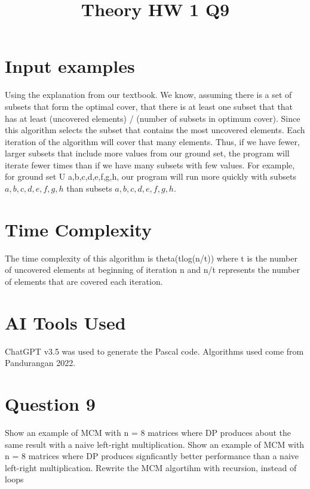 \documentclass[conference]{IEEEtran}
\begin{document}
\section{Input examples}
Using the explanation from our textbook. We know, assuming there is a set of subsets that form the optimal cover, that there is at least one subset that that has at least (uncovered elements) / (number of subsets in optimum cover). Since this algorithm selects the subset that contains the most uncovered elements. Each iteration of the algorithm will cover that many elements. Thus, if we have fewer, larger subsets that include more values from our ground set, the program will iterate fewer times than if we have many subsets with few values. For example, for ground set U {a,b,c,d,e,f,g,h}, our program will run more quickly with subsets ${a,b,c,d}, {e,f,g,h}$ than subsets ${a}, {b}, {c}, {d}, {e}, {f}, {g}, {h}$.

\section{Time Complexity}
The time complexity of this algorithm is theta(tlog(n/t)) where t is the number of uncovered elements at beginning of iteration n and n/t represents the number of elements that are covered each iteration.

\section{AI Tools Used}
ChatGPT v3.5 was used to generate the Pascal code. Algorithms used come from Pandurangan 2022.

\title{Theory HW 1 Q9}

\author{
}

\maketitle

\section{Question 9}
%
Show an example of MCM with n = 8 matrices where DP produces about the same result with
a naive left-right multiplication.
Show an example of MCM with n = 8 matrices where DP produces signficantly better performance than a naive left-right multiplication.
Rewrite the MCM algortihm with recursion, instead of loops
\end{document}

